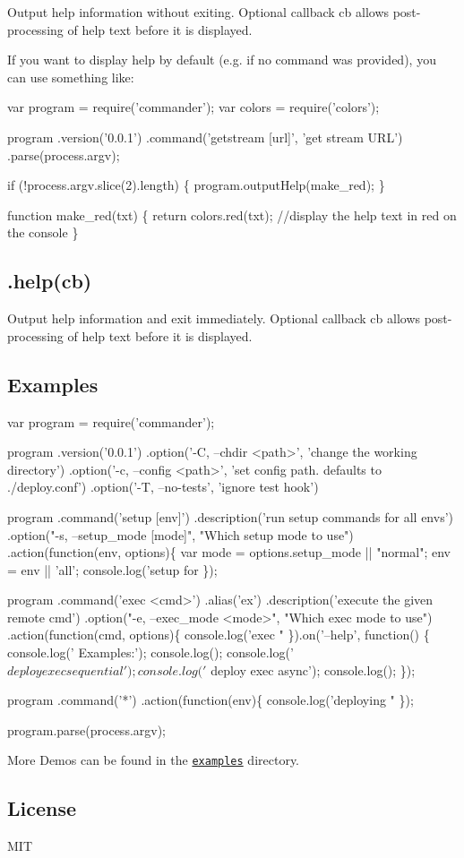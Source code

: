 Output help information without exiting. Optional callback cb allows post-\/processing of help text before it is displayed.

If you want to display help by default (e.\+g. if no command was provided), you can use something like\+:


\begin{DoxyCode}
var program = require('commander');
var colors = require('colors');

program
  .version('0.0.1')
  .command('getstream [url]', 'get stream URL')
  .parse(process.argv);

  if (!process.argv.slice(2).length) \{
    program.outputHelp(make\_red);
  \}

function make\_red(txt) \{
  return colors.red(txt); //display the help text in red on the console
\}
\end{DoxyCode}


\subsection*{.help(cb)}

Output help information and exit immediately. Optional callback cb allows post-\/processing of help text before it is displayed.

\subsection*{Examples}


\begin{DoxyCode}
var program = require('commander');

program
  .version('0.0.1')
  .option('-C, --chdir <path>', 'change the working directory')
  .option('-c, --config <path>', 'set config path. defaults to ./deploy.conf')
  .option('-T, --no-tests', 'ignore test hook')

program
  .command('setup [env]')
  .description('run setup commands for all envs')
  .option("-s, --setup\_mode [mode]", "Which setup mode to use")
  .action(function(env, options)\{
    var mode = options.setup\_mode || "normal";
    env = env || 'all';
    console.log('setup for %
  \});

program
  .command('exec <cmd>')
  .alias('ex')
  .description('execute the given remote cmd')
  .option("-e, --exec\_mode <mode>", "Which exec mode to use")
  .action(function(cmd, options)\{
    console.log('exec "%
  \}).on('--help', function() \{
    console.log('  Examples:');
    console.log();
    console.log('    $ deploy exec sequential');
    console.log('    $ deploy exec async');
    console.log();
  \});

program
  .command('*')
  .action(function(env)\{
    console.log('deploying "%
  \});

program.parse(process.argv);
\end{DoxyCode}


More Demos can be found in the \href{https://github.com/tj/commander.js/tree/master/examples}{\tt examples} directory.

\subsection*{License}

M\+IT 